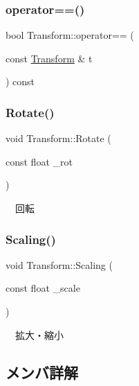 \mbox{\label{class_transform_a0a2d49f8c1b9a2229846534f9bcc63d4}} 
\subsubsection{\texorpdfstring{operator==()}{operator==()}}
{\footnotesize\ttfamily bool Transform\+::operator== (\begin{DoxyParamCaption}\item[{const \mbox{\hyperlink{class_transform}{Transform}} \&}]{t }\end{DoxyParamCaption}) const}

\mbox{\label{class_transform_a696d7e837eafa09409150fb055daa223}} 
\subsubsection{\texorpdfstring{Rotate()}{Rotate()}}
{\footnotesize\ttfamily void Transform\+::\+Rotate (\begin{DoxyParamCaption}\item[{const float}]{\+\_\+rot }\end{DoxyParamCaption})}



　回転 

\mbox{\label{class_transform_ad6097ddf1d30f5a1023725efbee375fb}} 
\subsubsection{\texorpdfstring{Scaling()}{Scaling()}}
{\footnotesize\ttfamily void Transform\+::\+Scaling (\begin{DoxyParamCaption}\item[{const float}]{\+\_\+scale }\end{DoxyParamCaption})}



　拡大・縮小 



\subsection{メンバ詳解}
\mbox{\label{class_transform_a25bce2389cc280e8adf193bdbb00d94a}} 
